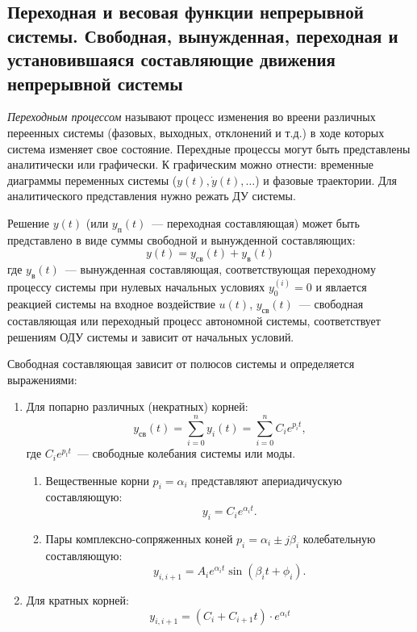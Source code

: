 \subsection{Переходная и весовая функции непрерывной системы. Свободная, вынужденная, переходная и установившаяся составляющие движения непрерывной системы}

\textit{Переходным процессом} называют процесс изменения во вреени различных переенных системы (фазовых, выходных, отклонений и т.д.) в ходе которых система изменяет свое состояние.
Перехдные процессы могут быть представлены аналитически или графически.
К графическим можно отнести: временные диаграммы переменных системы ($y(t), \dot y(t), \dots$) и фазовые траектории.
Для аналитического представления нужно режать ДУ системы.

Решение $y(t)$ (или $y_{\text{п}}(t)$~--- переходная составляющая) может быть представлено в виде суммы свободной и вынужденной составляющих:
\begin{equation}
    y(t) = y_{\text{св}}(t) + y_{\text{в}}(t)
\end{equation}
где $y_{\text{в}}(t)$~--- вынужденная составляющая, соответствующая переходному процессу системы при нулевых начальных условиях $y_0^{(i)} = 0$ и явлается реакцией системы на входное воздействие $u(t)$,
$y_{\text{св}} (t)$~--- свободная составляющая или переходный процесс автономной системы, соответствует решениям ОДУ системы и зависит от начальных условий.

Свободная составляющая зависит от полюсов системы и определяется выражениями:
\begin{enumerate}
    \item Для попарно различных (некратных) корней:
    \begin{equation}
        y_{\text{св}} (t) = \sum\limits_{i=0}^{n} y_i(t) = \sum\limits_{i=0}^{n} C_i e^{p_i t},
    \end{equation}
    где $C_i e^{p_t t}$~--- свободные колебания системы или моды.
    \begin{enumerate}
        \item Вещественные корни $p_i = \alpha_i$ представляют апериадичускую составляющую:
        \begin{equation}
            y_i = C_i e^{\alpha_i t}.
        \end{equation}
        \item Пары комплексно-сопряженных коней $p_i = \alpha_i \pm j \beta_i$ колебательную составляющую:
        \begin{equation}
            y_{i, i+1} = A_i e^{\alpha_i t} \sin{(\beta_i t + \phi_i)}.
        \end{equation}
    \end{enumerate}
    \item Для кратных корней:
    \begin{equation}
        y_{i, i+1} = (C_i + C_{i+1} t) \cdot e^{\alpha_i t}
    \end{equation}
\end{enumerate}

